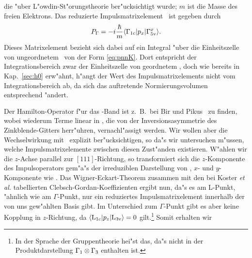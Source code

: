 die "uber L"owdin-St"orungstheorie \cite{lowd:51} ber"ucksichtigt wurde; $m$
ist die Masse des freien Elektrons. Das reduzierte Impulsmatrixelement \PG\ 
ist gegeben durch
%
\begin{displaymath}
  P_{\Gamma} = - i \frac{\hbar}{m} \langle {\ensuremath{\Gamma_{1 \text{c}}}} | {\protect p_{x}} | {\Gamma^{x}_{5 \text{v}}} \rangle.
\end{displaymath}
%
Dieses Matrixelement bezieht sich dabei auf ein Integral "uber die
Einheitszelle von ungeordnetem \GaInP\ von der Form \eqref{eq:pnnK}. Dort
entspricht der Integrationsbereich zwar der Einheitszelle von geordnetem
\GaInP, doch wie bereits in Kap.~\ref{sec:h0} erw"ahnt, h"angt der Wert des
Impulsmatrixelements nicht vom Integrationsbereich ab, da sich das auftretende
Normierungsvolumen entsprechend "andert.

Der Hamilton-Operator f"ur das \LVB-Band ist z.~B.\ bei Bir und
Pikus~\cite{bipi:74} zu finden, wobei wiederum Terme linear in , die
von der Inversionsasymmetrie des Zinkblende-Gitters herr"uhren,
vernachl"assigt werden. Wir wollen aber die Wechselwirkung mit \LCB\ explizit
ber"ucksichtigen, so da"s wir untersuchen m"ussen, welche Impulsmatrixelemente
zwischen diesen Zust"anden existieren. W"ahlen wir die $z$-Achse parallel zur
$[111]$-Richtung, so transformiert sich die $z$-Komponente des Impulsoperators
gem"a"s der irreduziblen Darstellung \IRREP{1} von \Cdv, $x$- und
$y$-Komponente wie \IRREP{3}. Das Wigner-Eckart-Theorem zusammen mit den bei
Koster \emph{et al.} \cite{kdws:63} tabellierten Clebsch-Gordan-Koeffizienten
ergibt nun, da"s es am L-Punkt, "ahnlich wie am $\Gamma$-Punkt, nur ein
reduziertes Impulsmatrixelement innerhalb der von uns gew"ahlten Basis gibt.
Im Unterschied zum $\Gamma$-Punkt gibt es aber keine Kopplung in $z$-Richtung,
da $\langle {\ensuremath{\text{L}_{1 \text{c}}}} | {\protect p_{z}} | {\text{L}_{3 \text{v}}} \rangle = 0 $ gilt.\footnote{In der Sprache der
  Gruppentheorie hei"st das, da"s \IRREP{1} nicht in der Produktdarstellung
  $\Gamma_{1} \otimes \Gamma_{3}$ enthalten ist.}  Somit erhalten wir
%
  \vspace*{4ex}
